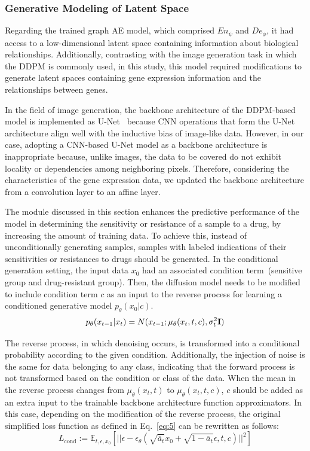 \documentclass[runningheads]{llncs}
\begin{document}
\subsubsection{Generative Modeling of Latent Space}

Regarding the trained graph AE model, which comprised $En_{\psi}$ and $De_{\phi}$, it had access to a low-dimensional latent space containing information about biological relationships. Additionally, contrasting with the image generation task in which the DDPM is commonly used, in this study, this model required modifications to generate latent spaces containing gene expression information and the relationships between genes.

In the field of image generation, the backbone architecture of the
DDPM-based model is implemented as U-Net~\cite{unet} because CNN
operations that form the U-Net architecture align well with the
inductive bias of image-like data. However, in our case, adopting a
CNN-based U-Net model as a backbone architecture is inappropriate
because, unlike images, the data to be covered do not exhibit locality
or dependencies among neighboring pixels. Therefore, considering the
characteristics of the gene expression data, we updated the backbone architecture from a convolution layer to an affine layer.

The module discussed in this section enhances the predictive
performance of the model in determining the sensitivity or resistance
of a sample to a drug, by increasing the amount of training data. To
achieve this, instead of unconditionally generating samples, samples
with labeled indications of their sensitivities or resistances to
drugs should be generated. In the conditional generation setting, the
input data $x_0$ had an associated condition term~(sensitive group and
drug-resistant group). Then, the diffusion model needs to be modified to include condition term $c$ as an input to the reverse process for learning a conditioned generative model $p_{\theta}(x_0|c)$.
%
\begin{equation}
p_{\theta}(x_{t-1}|x_t) = N(x_{t-1}; \mu_{\theta}(x_t, t, c), \sigma_{t}^2\bf{I})
\end{equation}

The reverse process, in which denoising occurs, is transformed into a
conditional probability according to the given condition. Additionally, the
injection of noise is the same for data belonging to any class,
indicating that the forward process is not transformed based on the
condition or class of the data. When the mean in the reverse process
changes from $\mu_{\theta}(x_t, t)$ to $\mu_{\theta}(x_t, t, c)$, $c$ should be added as an extra input to the trainable backbone architecture function approximators. In this case, depending on the modification of the reverse process, the original simplified loss function as defined in Eq.~\eqref{eq:5} can be rewritten as follows:
%
\begin{equation}
L_{\text{cond}} :=  \mathbb{E}_{t, \epsilon, x_0} \left[ || \epsilon - \epsilon_{\theta} (\sqrt{\overline{a}_t} x_0 + \sqrt{1-\overline{a}_t} \epsilon, t, c) ||^2 \right]
\end{equation}
\end{document}
